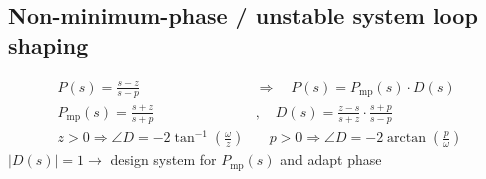 \subsection{Non-minimum-phase / unstable system loop shaping}
\begin{align*}
    P(s) = \frac{s - z}{s - p} %
    \quad &\Rightarrow \quad P(s) = P_{\text{mp}}(s) \cdot D(s)\\
    P_{\text{mp}}(s) = \frac{s + z}{s + p}\quad &, \quad
    D(s) = \frac{z - s}{s + z} \cdot \frac{s + p}{s - p}\\
    z > 0 \Rightarrow \angle D = -2 \tan^{-1}(\frac{\omega}{z}) &\quad
    p > 0 \Rightarrow \angle D = -2 \arctan(\frac{p}{\omega})
\end{align*}
$|D(s)| = 1 \rightarrow$ design system for $P_{\text{mp}}(s)$ and adapt phase